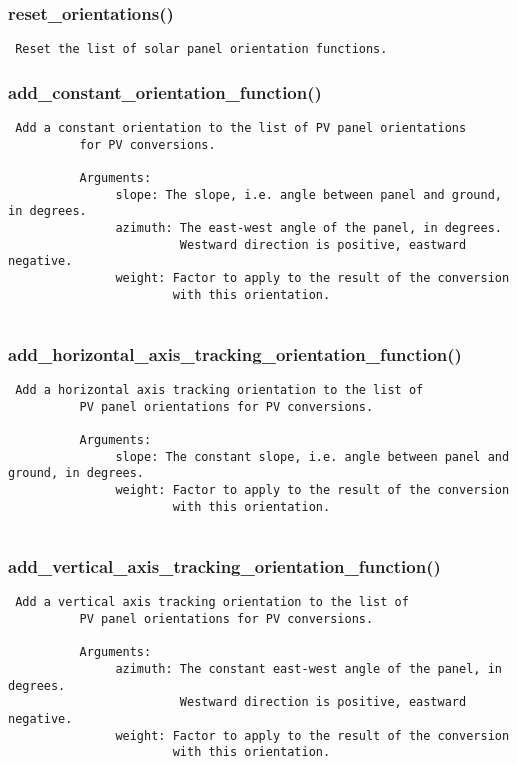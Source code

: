 \subsubsection{reset\_orientations()}


\begin{verbatim}
 Reset the list of solar panel orientation functions. 
\end{verbatim}
\subsubsection{add\_constant\_orientation\_function()}


\begin{verbatim}
 Add a constant orientation to the list of PV panel orientations
          for PV conversions. 
          
          Arguments:
               slope: The slope, i.e. angle between panel and ground, in degrees.
               azimuth: The east-west angle of the panel, in degrees.
                        Westward direction is positive, eastward negative.
               weight: Factor to apply to the result of the conversion
                       with this orientation.
          
\end{verbatim}
\subsubsection{add\_horizontal\_axis\_tracking\_orientation\_function()}


\begin{verbatim}
 Add a horizontal axis tracking orientation to the list of
          PV panel orientations for PV conversions. 
          
          Arguments:
               slope: The constant slope, i.e. angle between panel and ground, in degrees.
               weight: Factor to apply to the result of the conversion
                       with this orientation.
          
\end{verbatim}
\subsubsection{add\_vertical\_axis\_tracking\_orientation\_function()}


\begin{verbatim}
 Add a vertical axis tracking orientation to the list of
          PV panel orientations for PV conversions. 
          
          Arguments:
               azimuth: The constant east-west angle of the panel, in degrees.
                        Westward direction is positive, eastward negative.
               weight: Factor to apply to the result of the conversion
                       with this orientation.
          
\end{verbatim}
